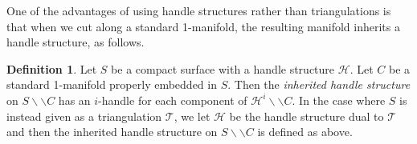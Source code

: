 \documentclass[oneside]{amsart}
\numberwithin{equation}{section}
\theoremstyle{plain}
\theoremstyle{definition}
\newtheorem{definition}[equation]{Definition}
\newcommand{\calT}{{\mathcal{T}}}
\newcommand{\cut}{\backslash\backslash}
\newcommand{\calH}{\mathcal{H}}
\begin{document}


One of the advantages of using handle structures rather than triangulations is that when we cut along a standard 1-manifold, the resulting manifold inherits a handle structure, as follows.


\begin{definition}
\label{Def:InheritedHS}
Let $S$ be a compact surface with a handle structure $\calH$. Let $C$ be a standard 1-manifold properly embedded in $S$. Then the \emph{inherited handle structure} on $S \cut C$ has an $i$-handle for each component of $\calH^i \cut C$. In the case where $S$ is instead given as a triangulation $\calT$, we let $\calH$ be the handle structure dual to $\calT$ and then the inherited handle structure on $S \cut C$ is defined as above.
\end{definition}
\end{document}

